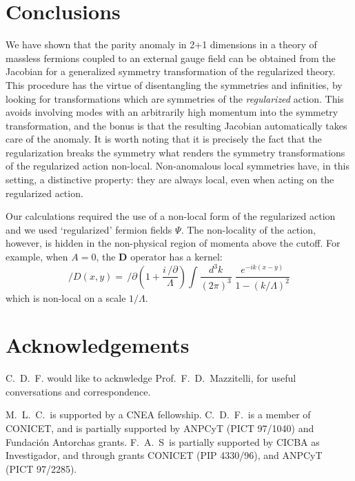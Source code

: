 \documentclass[a4paper,12pt]{article}
\newcommand{\spartial}{/\!\!\!\partial}
\newcommand{\Dslash}{/\!\!\!\!D}
\begin{document}
\section{Conclusions}\label{sec:concl}

We have shown that the parity anomaly in 2+1 dimensions in a theory of
massless fermions coupled to an external gauge field can be obtained
from the Jacobian for a generalized symmetry transformation of the
regularized theory. This procedure has the virtue of disentangling the
symmetries and infinities, by looking for transformations which are
symmetries of the {\em regularized\/} action. This avoids involving
modes with an arbitrarily high momentum into the symmetry
transformation, and the bonus is that the resulting Jacobian
automatically takes care of the anomaly. It is worth noting that it is
precisely the fact that the regularization breaks the symmetry what
renders the symmetry transformations of the regularized action
non-local.  Non-anomalous local symmetries have, in this setting, a
distinctive property: they are always local, even when acting on the
regularized action.


Our calculations required the use of a non-local form of the
regularized action and we used `regularized' fermion fields $\Psi$.
The non-locality of the action, however, is hidden in the non-physical
region of momenta above the cutoff. For example, when $A=0$, the
${\mathbf D}$ operator has a kernel:
\begin{equation}
\Dslash(x,y) = \,\spartial \left( 1+\frac{i\,\spartial}{\Lambda}
\right) \int \frac{d^3k}{(2\pi)^3} \;
\frac{e^{-ik(x-y)}}{1-(k/\Lambda)^2}
\end{equation}
which is non-local on a scale ${1}/{\Lambda}$.



\section*{Acknowledgements}
C.~D.~F. would like to acknwledge Prof.~F.~D.~Mazzitelli, for useful
conversations and correspondence.

\noindent M.~L.~C.~is supported by a CNEA fellowship.  C.~D.~F.~is a member
of CONICET, and is partially supported by ANPCyT (PICT 97/1040) and
Fundaci\'on Antorchas grants.  F.~A.~S~is partially supported by CICBA
as Investigador, and through grants CONICET (PIP 4330/96), and ANPCyT
(PICT 97/2285).
\end{document}

